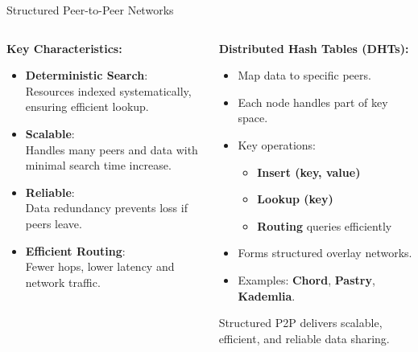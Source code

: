 \documentclass[aspectratio=169, table]{beamer}
\begin{document}
\begin{frame}{Structured Peer-to-Peer Networks}
\vspace{20pt}
\begin{columns}[t]

\begin{column}{0.5\textwidth}
\textbf{Key Characteristics:}
\begin{itemize}
\item \textbf{Deterministic Search}: \\
Resources indexed systematically, ensuring efficient lookup.

\item \textbf{Scalable}: \\
Handles many peers and data with minimal search time increase.

\item \textbf{Reliable}: \\
Data redundancy prevents loss if peers leave.

\item \textbf{Efficient Routing}: \\
Fewer hops, lower latency and network traffic.
\end{itemize}
\end{column}

\begin{column}{0.5\textwidth}
\textbf{Distributed Hash Tables (DHTs):}
\begin{itemize}
\item Map data to specific peers.
\item Each node handles part of key space.
\item Key operations:
\begin{itemize}
\item \textbf{Insert (key, value)}
\item \textbf{Lookup (key)}
\item \textbf{Routing} queries efficiently
\end{itemize}
\item Forms structured overlay networks.
\item Examples: \textbf{Chord}, \textbf{Pastry}, \textbf{Kademlia}.
\end{itemize}

\vspace{10pt}
Structured P2P delivers scalable, efficient, and reliable data sharing.
\end{column}

\end{columns}
\end{frame}
\end{document}
